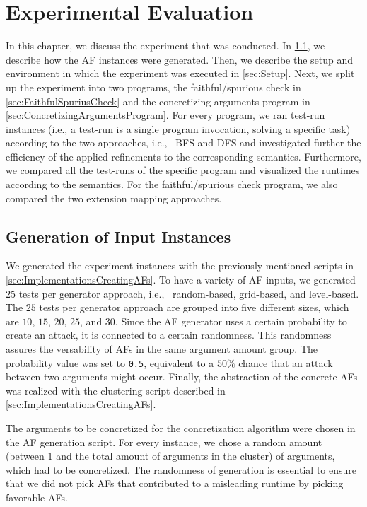 \chapter{Experimental Evaluation}
\label{ch:experiment}
In this chapter, we discuss the experiment that was conducted. In \cref{sec:GenerationOfInputInstances}, we describe how the AF instances were generated. Then, we describe the setup and environment in which the experiment was executed in \cref{sec:Setup}. Next, we split up the experiment into two programs, the faithful/spurious check in \cref{sec:FaithfulSpuriusCheck} and the concretizing arguments program in \cref{sec:ConcretizingArgumentsProgram}. For every program, we ran test-run instances (i.e., a test-run is a single program invocation, solving a specific task) according to the two approaches, i.e., \ BFS and DFS and investigated further the efficiency of the applied refinements to the corresponding semantics. Furthermore, we compared all the test-runs of the specific program and visualized the runtimes according to the semantics. For the faithful/spurious check program, we also compared the two extension mapping approaches.


\section{Generation of Input Instances}
\label{sec:GenerationOfInputInstances}
We generated the experiment instances with the previously mentioned scripts in \cref{sec:ImplementationsCreatingAFs}. To have a variety of AF inputs, we generated $25$ tests per generator approach, i.e., \ random-based, grid-based, and level-based. The $25$ tests per generator approach are grouped into five different sizes, which are $10$, $15$, $20$, $25$, and $30$. Since the AF generator uses a certain probability to create an attack, it is connected to a certain randomness. This randomness assures the versability of AFs in the same argument amount group. The probability value was set to \texttt{0.5}, equivalent to a $50\%$ chance that an attack between two arguments might occur. Finally, the abstraction of the concrete AFs was realized with the clustering script described in \cref{sec:ImplementationsCreatingAFs}. 

The arguments to be concretized for the concretization algorithm were chosen in the AF generation script. For every instance, we chose a random amount (between $1$ and the total amount of arguments in the cluster) of arguments, which had to be concretized. The randomness of generation is essential to ensure that we did not pick AFs that contributed to a misleading runtime by picking favorable AFs.


